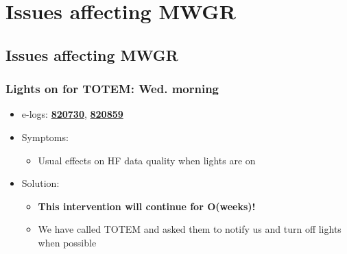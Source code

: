 \documentclass[bigger]{beamer}
\providecommand{\alert}[1]{\textbf{#1}}
\begin{document}
\section{Issues affecting MWGR}
\label{sec-2}
\subsection{Issues affecting MWGR}
\label{sec-2-1}
\begin{frame}
\frametitle{Lights on for TOTEM: Wed. morning}
\label{sec-2-1-1}
\begin{itemize}

\item e-logs: \href{http://cmsonline.cern.ch/cms-elog/820730}{\alert{820730}}, \href{http://cmsonline.cern.ch/cms-elog/820859}{\alert{820859}}
\label{sec-2-1-1-1}%

\item Symptoms:
\label{sec-2-1-1-2}%
\begin{itemize}

\item Usual effects on HF data quality when lights are on
\label{sec-2-1-1-2-1}%
\end{itemize} %

\item Solution:
\label{sec-2-1-1-3}%
\begin{itemize}

\item \alert{This intervention will continue for O(weeks)!}
\label{sec-2-1-1-3-1}%

\item We have called TOTEM and asked them to notify us and turn off lights when possible
\label{sec-2-1-1-3-2}%
\end{itemize} %
\end{itemize} %
\end{frame}
\end{document}
